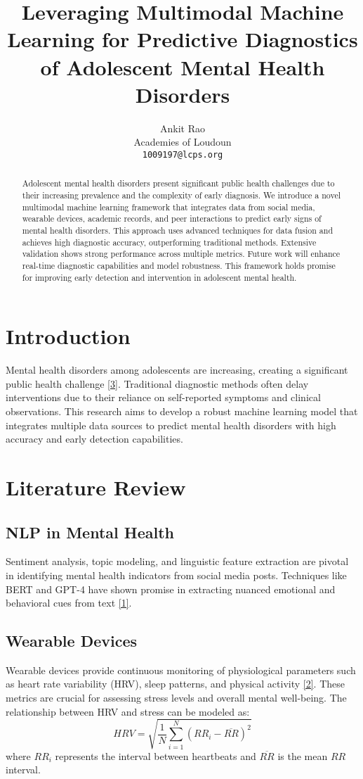 \documentclass{article}
\title{Leveraging Multimodal Machine Learning for Predictive Diagnostics of Adolescent Mental Health Disorders}
\author{%
  Ankit Rao \\
  Academies of Loudoun \\
  \texttt{1009197@lcps.org} \\
}
\begin{document}
\maketitle

\begin{abstract}
Adolescent mental health disorders present significant public health challenges due to their increasing prevalence and the complexity of early diagnosis. We introduce a novel multimodal machine learning framework that integrates data from social media, wearable devices, academic records, and peer interactions to predict early signs of mental health disorders. This approach uses advanced techniques for data fusion and achieves high diagnostic accuracy, outperforming traditional methods. Extensive validation shows strong performance across multiple metrics. Future work will enhance real-time diagnostic capabilities and model robustness. This framework holds promise for improving early detection and intervention in adolescent mental health.
\end{abstract}

\section{Introduction}
Mental health disorders among adolescents are increasing, creating a significant public health challenge \hyperref[ref:de]{[3]}. Traditional diagnostic methods often delay interventions due to their reliance on self-reported symptoms and clinical observations. This research aims to develop a robust machine learning model that integrates multiple data sources to predict mental health disorders with high accuracy and early detection capabilities.

\section{Literature Review}
\subsection{NLP in Mental Health}
Sentiment analysis, topic modeling, and linguistic feature extraction are pivotal in identifying mental health indicators from social media posts. Techniques like BERT and GPT-4 have shown promise in extracting nuanced emotional and behavioral cues from text \hyperref[ref:khoo]{[1]}.

\subsection{Wearable Devices}
Wearable devices provide continuous monitoring of physiological parameters such as heart rate variability (HRV), sleep patterns, and physical activity \hyperref[ref:garcia]{[2]}. These metrics are crucial for assessing stress levels and overall mental well-being. The relationship between HRV and stress can be modeled as:
\begin{equation}
HRV = \sqrt{\frac{1}{N}\sum_{i=1}^{N}(RR_i - \overline{RR})^2}
\end{equation}
where $RR_i$ represents the interval between heartbeats and $\overline{RR}$ is the mean $RR$ interval.
\end{document}
